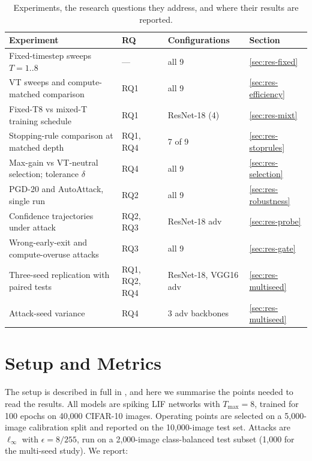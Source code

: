 \begin{table}[htbp]
    \centering
    \caption{Experiments, the research questions they address, and where their results are reported.}
    \label{tab:res-map}
    \small
    \begin{tabularx}{\textwidth}{@{}>{\raggedright\arraybackslash}X l l l@{}}
        \toprule
        Experiment & RQ & Configurations & Section \\
        \midrule
        Fixed-timestep sweeps $T = 1..8$                       & ---      & all 9                 & \ref{sec:res-fixed} \\
        VT sweeps and compute-matched comparison               & RQ1      & all 9                 & \ref{sec:res-efficiency} \\
        Fixed-T8 vs mixed-T training schedule                  & RQ1      & ResNet-18 (4)         & \ref{sec:res-mixt} \\
        Stopping-rule comparison at matched depth              & RQ1, RQ4 & 7 of 9                & \ref{sec:res-stoprules} \\
        Max-gain vs VT-neutral selection; tolerance $\delta$   & RQ4      & all 9                 & \ref{sec:res-selection} \\
        PGD-20 and AutoAttack, single run                      & RQ2      & all 9                 & \ref{sec:res-robustness} \\
        Confidence trajectories under attack                   & RQ2, RQ3 & ResNet-18 adv         & \ref{sec:res-probe} \\
        Wrong-early-exit and compute-overuse attacks           & RQ3      & all 9                 & \ref{sec:res-gate} \\
        Three-seed replication with paired tests               & RQ1, RQ2, RQ4 & ResNet-18, VGG16 adv & \ref{sec:res-multiseed} \\
        Attack-seed variance                                   & RQ4      & 3 adv backbones       & \ref{sec:res-multiseed} \\
        \bottomrule
    \end{tabularx}
\end{table}

\section{Setup and Metrics}
\label{sec:res-setup}

The setup is described in full in , and here we summarise the points needed to read the results. All models are spiking LIF networks with $T_{\max} = 8$, trained for 100 epochs on 40{,}000 CIFAR-10 images. Operating points are selected on a 5{,}000-image calibration split and reported on the 10{,}000-image test set. Attacks are $\ell_\infty$ with $\epsilon = 8/255$, run on a 2{,}000-image class-balanced test subset (1{,}000 for the multi-seed study). We report:

